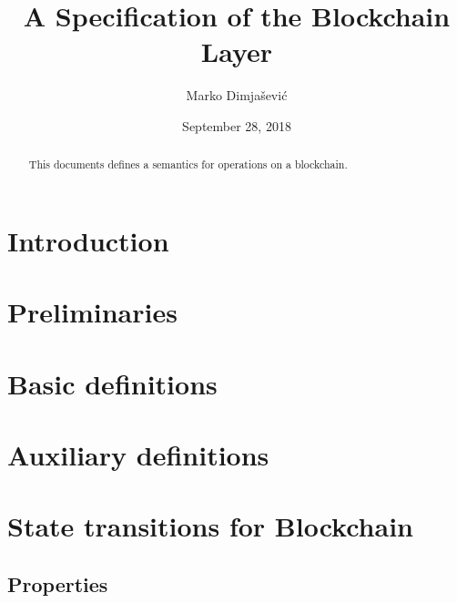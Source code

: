 \documentclass[11pt,a4paper]{article}
\begin{document}
\title{A Specification of the Blockchain Layer}

\author{Marko Dimjašević}

\date{September 28, 2018}

\maketitle

\begin{abstract}
This documents defines a semantics for operations on a blockchain.
\end{abstract}

\tableofcontents
\listoffigures

\section{Introduction}
\label{sec:introduction}

\section{Preliminaries}
\label{sec:preliminaries}

\section{Basic definitions}
\label{sec:basic-definitions}

\section{Auxiliary definitions}
\label{sec:auxil-defin}

\section{State transitions for Blockchain}
\label{sec:state-trans-chain}

\subsection{Properties}
\label{sec:chain-properties}
\end{document}
